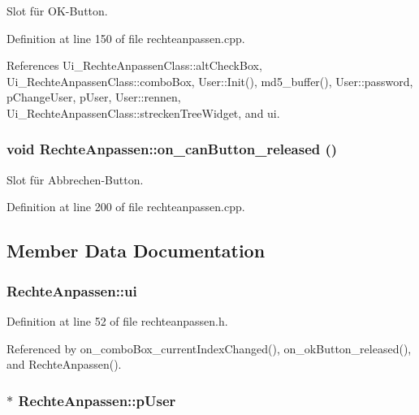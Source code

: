 Slot für OK-Button. 



Definition at line 150 of file rechteanpassen.cpp.

References Ui\_\-RechteAnpassenClass::altCheckBox, Ui\_\-RechteAnpassenClass::comboBox, User::Init(), md5\_\-buffer(), User::password, pChangeUser, pUser, User::rennen, Ui\_\-RechteAnpassenClass::streckenTreeWidget, and ui.\hypertarget{class_rechte_anpassen_1ce3a9c5ff746deed0ce1e3d3fc15e32}{
\subsubsection[on\_\-canButton\_\-released]{\setlength{\rightskip}{0pt plus 5cm}void RechteAnpassen::on\_\-canButton\_\-released ()}}
\label{class_rechte_anpassen_1ce3a9c5ff746deed0ce1e3d3fc15e32}


Slot für Abbrechen-Button. 



Definition at line 200 of file rechteanpassen.cpp.

\subsection{Member Data Documentation}
\hypertarget{class_rechte_anpassen_719e0dbae69c18a8d0f5002eba93b667}{
\subsubsection[ui]{ {\bf RechteAnpassen::ui}}}
\label{class_rechte_anpassen_719e0dbae69c18a8d0f5002eba93b667}




Definition at line 52 of file rechteanpassen.h.

Referenced by on\_\-comboBox\_\-currentIndexChanged(), on\_\-okButton\_\-released(), and RechteAnpassen().\hypertarget{class_rechte_anpassen_edb76e8d5e19b1e27db72350a393ea0a}{
\subsubsection[pUser]{$\ast$ {\bf RechteAnpassen::pUser}}}
\label{class_rechte_anpassen_edb76e8d5e19b1e27db72350a393ea0a}




